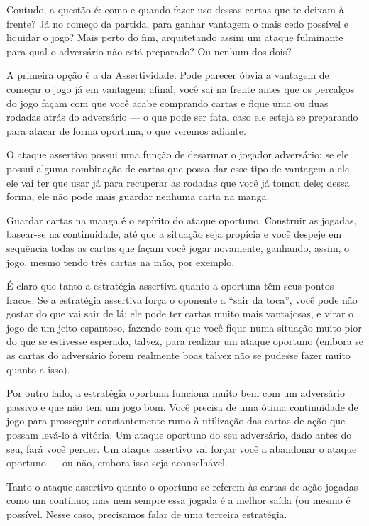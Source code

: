 Contudo, a questão é: como e quando fazer uso dessas cartas que te deixam à frente? Já no começo da partida, para ganhar vantagem o mais cedo possível e liquidar o jogo? Mais perto do fim, arquitetando assim um ataque fulminante para qual o adversário não está preparado? Ou nenhum dos dois?

A primeira opção é a da Assertividade. Pode parecer óbvia a vantagem de começar o jogo já em vantagem; afinal, você sai na frente antes que os percalços do jogo façam com que você acabe comprando cartas e fique uma ou duas rodadas atrás do adversário --- o que pode ser fatal caso ele esteja se preparando para atacar de forma oportuna, o que veremos adiante.

O ataque assertivo possui uma função de desarmar o jogador adversário; se ele possui alguma combinação de cartas que possa dar esse tipo de vantagem a ele, ele vai ter que usar já para recuperar as rodadas que você já tomou dele; dessa forma, ele não pode mais guardar nenhuma carta na manga.

Guardar cartas na manga é o espírito do ataque oportuno. Construir as jogadas, basear-se na continuidade, até que a situação seja propícia e você despeje em sequência todas as cartas que façam você jogar novamente, ganhando, assim, o jogo, mesmo tendo três cartas na mão, por exemplo.

É claro que tanto a estratégia assertiva quanto a oportuna têm seus pontos fracos. Se a estratégia assertiva força o oponente a ``sair da toca'', você pode não gostar do que vai sair de lá; ele pode ter cartas muito mais vantajosas, e virar o jogo de um jeito espantoso, fazendo com que você fique numa situação muito pior do que se estivesse esperado, talvez, para realizar um ataque oportuno (embora se as cartas do adversário forem realmente boas talvez não se pudesse fazer muito quanto a isso).

Por outro lado, a estratégia oportuna funciona muito bem com um adversário passivo e que não tem um jogo bom. Você precisa de uma ótima continuidade de jogo para prosseguir constantemente rumo à utilização das cartas de ação que possam levá-lo à vitória. Um ataque oportuno do seu adversário, dado antes do seu, fará você perder. Um ataque assertivo vai forçar você a abandonar o ataque oportuno --- ou não, embora isso seja aconselhável.

Tanto o ataque assertivo quanto o oportuno se referem às cartas de ação jogadas como um contínuo; mas nem sempre essa jogada é a melhor saída (ou mesmo é possível. Nesse caso, precisamos falar de uma terceira estratégia.

